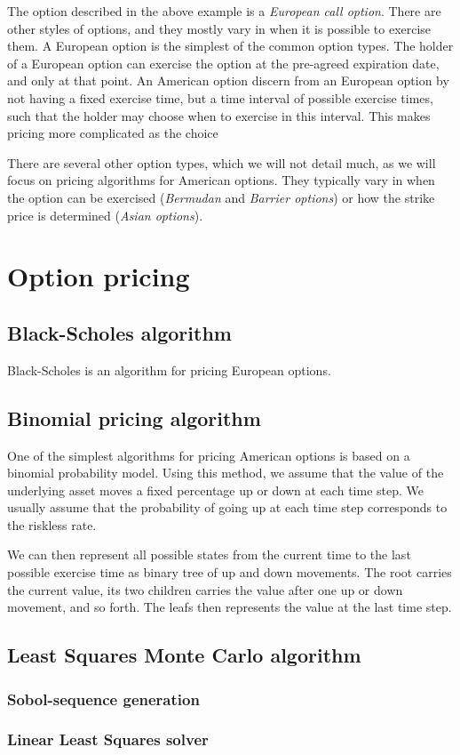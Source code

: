 The option described in the above example is a \textit{European call
  option}.  There are other styles of options, and they mostly vary in
when it is possible to exercise them. A European option is the
simplest of the common option types. The holder of a European option
can exercise the option at the pre-agreed expiration date, and only at
that point. An American option discern from an European option by not
having a fixed exercise time, but a time interval of possible exercise
times, such that the holder may choose when to exercise in this
interval. This makes pricing more complicated as the choice 

There are several other option types, which we will not detail much,
as we will focus on pricing algorithms for American options. They
typically vary in when the option can be exercised (\textit{Bermudan}
and \textit{Barrier options}) or how the strike price is determined
(\textit{Asian options}).

\section{Option pricing}

\subsection{Black-Scholes algorithm}
Black-Scholes is an algorithm for pricing European options.

\subsection{Binomial pricing algorithm}
One of the simplest algorithms for pricing American options is based
on a binomial probability model. Using this method, we assume that the
value of the underlying asset moves a fixed percentage up or down at
each time step. We usually assume that the probability of going up at
each time step corresponds to the riskless rate.

We can then represent all possible states from the current time to the
last possible exercise time as binary tree of up and down
movements. The root carries the current value, its two children
carries the value after one up or down movement, and so forth. The
leafs then represents the value at the last time step.

\subsection{Least Squares Monte Carlo algorithm}

\subsubsection{Sobol-sequence generation}

\subsubsection{Linear Least Squares solver}

